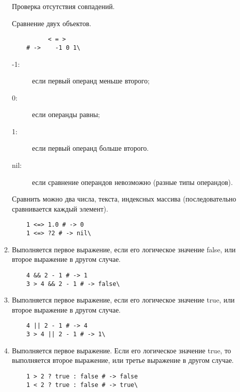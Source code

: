 \begin{enumerate}
  \begin{operator}
    Проверка отсутствия совпадений.
  \end{operator}

  \begin{operator}
    Сравнение двух объектов.
    \begin{verbatim}
          < = >
    # ->	-1 0 1\
    \end{verbatim}
    \begin{description}
      \item[-1:]  если первый операнд меньше второго;
      \item[0:]   если операнды равны;
      \item[1:]   если первый операнд больше второго.
      \item[nil:] если сравнение операндов невозможно (разные типы операндов).
    \end{description}

    Сравнить можно два числа, текста, индексных массива (последовательно сравнивается каждый элемент).
    \begin{verbatim}
    1 <=> 1.0 # -> 0
    1 <=> ?2 # -> nil\
    \end{verbatim}
  \end{operator}

  \item %
  \begin{operator}
    Выполняется первое выражение, если его логическое значение false, или второе выражение в другом случае.
    \begin{verbatim}
    4 && 2 - 1 # -> 1
    3 > 4 && 2 - 1 # -> false\
    \end{verbatim}
  \end{operator}

  \item %
  \begin{operator}
    Выполняется первое выражение, если его логическое значение true, или второе выражение в другом случае.
    \begin{verbatim}
    4 || 2 - 1 # -> 4
    3 > 4 || 2 - 1 # -> 1\
    \end{verbatim}
  \end{operator}

  \item %
  \begin{operator}
    Выполняется первое выражение. Если его логическое значение true, то выполняется второе выражение, или третье выражение в другом случае.
    \begin{verbatim}
    1 > 2 ? true : false # -> false
    1 < 2 ? true : false # -> true\
    \end{verbatim}
  \end{operator}


\end{enumerate}
